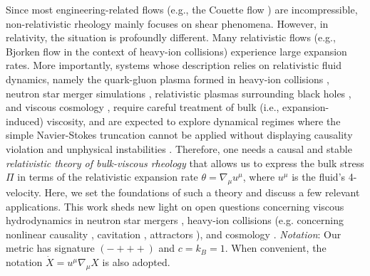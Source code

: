 \documentclass[aps,prl,noshowpacs,noshowkeys,floatfix,superscriptaddress,singlecolum,nofootinbib]{revtex4-2}
\theoremstyle{definition}
\theoremstyle{theorem}
\begin{document}
Since most engineering-related flows (e.g., the Couette flow \cite{landau6}) are incompressible, non-relativistic rheology mainly focuses on shear phenomena. However, in relativity, the situation is profoundly different. Many relativistic flows (e.g., Bjorken flow \cite{Bjorken1983} in the context of heavy-ion collisions) experience large expansion rates. More importantly, systems whose description relies on relativistic fluid dynamics, namely the quark-gluon plasma formed in heavy-ion collisions \cite{Romatschke:2017ejr}, neutron star merger simulations \cite{Rezzolla_Zanotti_book}, relativistic plasmas surrounding black holes \cite{EventHorizonTelescope:2022urf}, and viscous cosmology \cite{Brevik:2017msy}, require careful treatment of bulk (i.e., expansion-induced) viscosity, and are expected to explore dynamical regimes where the simple Navier-Stokes truncation \cite{LandauLifshitzFluids,EckartViscous} cannot be applied without displaying causality violation and unphysical instabilities \cite{Hiscock_Lindblom_instability_1985}. Therefore, one needs a causal and stable \emph{relativistic theory of bulk-viscous rheology} that allows us to express the bulk stress $\Pi$ in terms of the relativistic expansion rate $\theta=\nabla_\mu u^\mu$, where $u^\mu$ is the fluid's 4-velocity. Here, we set the foundations of such a theory and discuss a few relevant applications. This work sheds new light on open questions concerning viscous hydrodynamics in neutron star mergers \cite{AlfordBulk,BulkGavassino,Celora:2022nbp,CamelioSimulations2022,Most:2021zvc,Most:2022yhe}, heavy-ion collisions (e.g. concerning nonlinear causality \cite{Bemfica:2020xym,Plumberg:2021bme,Chiu:2021muk}, cavitation \cite{Torrieri:2008ip,Rajagopal:2009yw,Denicol:2015bpa,Byres:2019xld}, attractors \cite{Heller:2015dha,Romatschke:2017vte,Strickland:2017kux,Jankowski:2023fdz}), and cosmology \cite{Padmanabhan:1987dg,Hiscock:1991sp,Pavon:1990qf,Zakari:1993yhk,Maartens:1995wt,Zimdahl:1996ka,Fabris:2005ts,Colistete:2007xi,LiBarrow,Avelino,Hipolito1,Hipolito2,Gagnon,Piattella_et_al,Velten:2012uv,VeltenSchwarz,BG,Disconzi_Kephart_Scherrer_2015,DisconziKephartScherrerNew,
Cruz:2018psw,Cruz:2019uya,Brevik:2017msy}.   
\noindent \emph{Notation}: Our metric has signature $(-+++)$ and $c=k_B=1$. When convenient, the notation $\dot{X}=u^\mu \nabla_\mu X$ is also adopted.\\
\end{document}
